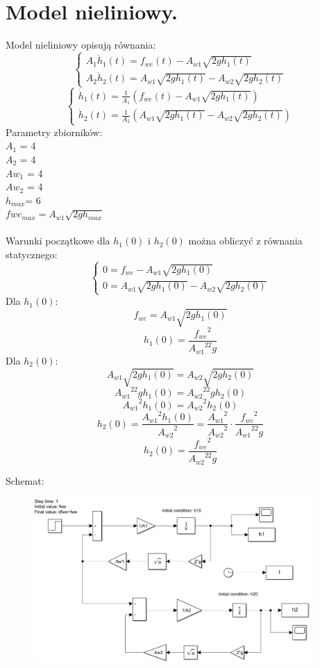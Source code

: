 \documentclass{article}
\begin{document}
\section{Model nieliniowy.}
Model nieliniowy opisują równania:
$$
  \begin{cases}
    A_1\dot h_{1}(t)=f_{we}(t)-A_{w1}\sqrt{2gh_1(t)}\\
    A_2\dot h_{2}(t)=A_{w1}\sqrt{2gh_1(t)}-A_{w2}\sqrt{2gh_2(t)}
  \end{cases}
$$
$$
  \begin{cases}
    \dot h_{1}(t)=\frac{1}{A_1} \left(f_{we}(t)-A_{w1}\sqrt{2gh_1(t)}\right)\\
    \dot h_{2}(t)= \frac{1}{A_{2}} \left( A_{w1}\sqrt{2gh_1(t)}-A_{w2}\sqrt{2gh_2(t)}\right)
  \end{cases}
$$
Parametry zbiorników:\\             
$A_1$ = 4 \\
$A_2$ = 4  \\
$Aw_1$ = 4  \\
$Aw_2$ = 4\\
$h_{max}$= 6 \\
$fwe_{max}=A_{w1}\sqrt{2gh_{max}}$\\\\
Warunki początkowe dla $h_1(0)$ i $h_2(0)$ można obliczyć z równania statycznego:
$$
\begin{cases}
    0=f_{we}-A_{w1}\sqrt{2gh_1(0)}\\
    0=A_{w1}\sqrt{2gh_1(0)}-A_{w2}\sqrt{2gh_2(0)}
 \end{cases}
 $$
 Dla $h_1(0):$
 $$
    f_{we}=A_{w1}\sqrt{2gh_1(0)}
 $$
 $$
 h_1(0)=\frac{{f_{we}}^2}{{A_{w1}}^22 g}
 $$
 Dla $h_2(0):$
 $$
     A_{w1}\sqrt{2gh_1(0)}=A_{w2}\sqrt{2gh_2(0)}
 $$
 $$
 {A_{w1}}^22gh_1(0)={A_{w2}}^22gh_2(0)
 $$
 $$
 {A_{w1}}^2h_1(0)={A_{w2}}^2h_2(0)
 $$
 $$
 h_2(0)=\frac{{A_{w1}}^2h_1(0)}{{A_{w2}}^2}=
 \frac{{A_{w1}}^2}{{A_{w2}}^2}\cdot\frac{{f_{we}}^2}{{A_{w1}}^22 g}
 $$
 $$
 h_2(0)=\frac{{f_{we}}^2}{{A_{w2}}^22g}
 $$
 


\begin{flushleft}
Schemat:

\end{flushleft}
\begin{figure}[h!]
    \centering
    \includegraphics[width=0.955\textwidth]{schematNL.png}
    \label{fig:my_label}
\end{figure}
\end{document}
